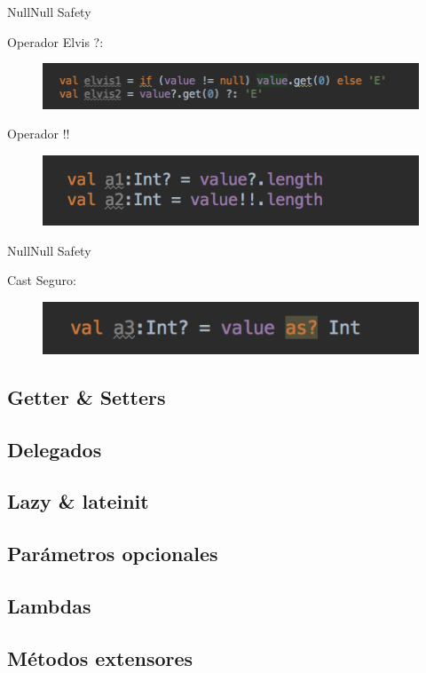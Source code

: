 \begin{frame}{Null}{Null Safety}
  \begin{block}{Operador Elvis ?:}
    \begin{figure}[h]
    \centering
    \includegraphics[width=\textwidth]{images/kotlin_vs_java/null_5}
    \end{figure}
  \end{block}
  \begin{block}{Operador !!}
    \begin{figure}[h]
    \centering
    \includegraphics[width=\textwidth]{images/kotlin_vs_java/null_6}
    \end{figure}
  \end{block}
\end{frame}

\begin{frame}{Null}{Null Safety}
  \begin{block}{Cast Seguro:}
    \begin{figure}[h]
    \centering
    \includegraphics[width=\textwidth]{images/kotlin_vs_java/null_7}
    \end{figure}
  \end{block}
\end{frame}





\subsection{Getter \& Setters}
\subsection{Delegados}
\subsection{Lazy \& lateinit}
\subsection{Parámetros opcionales}
\subsection{Lambdas}
\subsection{Métodos extensores}
